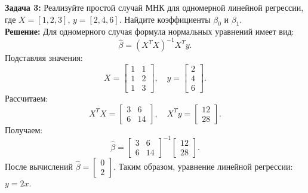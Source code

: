 \textbf{Задача 3:}  
Реализуйте простой случай МНК для одномерной линейной регрессии, где \(X = [1, 2, 3]\), \(y = [2, 4, 6]\). Найдите коэффициенты \(\beta_0\) и \(\beta_1\). \\
\textbf{Решение:}
Для одномерного случая формула нормальных уравнений имеет вид:
\[
\hat{\beta} = (X^T X)^{-1} X^T y.
\]
Подставляя значения:
\[
X = \begin{bmatrix}
1 & 1 \\
1 & 2 \\
1 & 3
\end{bmatrix}, \quad y = \begin{bmatrix} 2 \\ 4 \\ 6 \end{bmatrix}.
\]
Рассчитаем:
\[
X^T X = \begin{bmatrix}
3 & 6 \\
6 & 14
\end{bmatrix}, \quad X^T y = \begin{bmatrix}
12 \\
28
\end{bmatrix}.
\]
Получаем:
\[
\hat{\beta} = \begin{bmatrix}
3 & 6 \\
6 & 14
\end{bmatrix}^{-1} \begin{bmatrix}
12 \\
28
\end{bmatrix}.
\]
После вычислений \(\hat{\beta} = \begin{bmatrix} 0 \\ 2 \end{bmatrix}\). Таким образом, уравнение линейной регрессии: \(y = 2x\).
